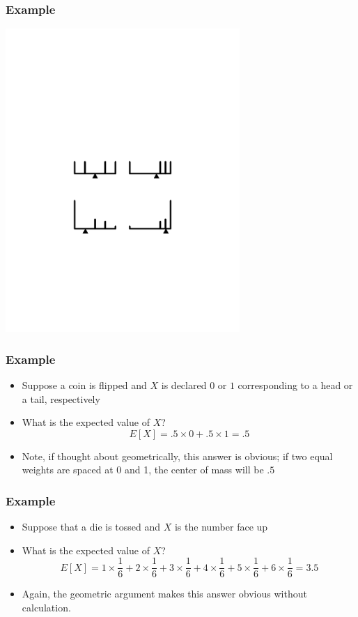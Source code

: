 \documentclass[aspectratio=169]{beamer}
\begin{document}
\begin{frame}
  \frametitle{Example}
  \includegraphics[width=3.5in]{expectation.pdf}
\end{frame}



\begin{frame}
  \frametitle{Example} 
  \begin{itemize}
  \item Suppose a coin is flipped and $X$ is declared $0$ or $1$ corresponding
    to a head or a tail, respectively
  \item What is the expected value of $X$? 
    $$
    E[X] = .5 \times 0 + .5 \times 1 = .5
    $$
  \item Note, if thought about geometrically, this answer is obvious; if two equal
    weights are spaced at 0 and 1, the center of mass will be $.5$
  \end{itemize}
\end{frame}

\begin{frame}\frametitle{Example} 
  \begin{itemize}
  \item Suppose that a die is tossed and $X$ is the number face up
  \item What is the expected value of $X$?
    $$
    E[X] = 1 \times \frac{1}{6} + 2 \times \frac{1}{6} +
    3 \times \frac{1}{6} + 4 \times \frac{1}{6} +
    5 \times \frac{1}{6} + 6 \times \frac{1}{6} = 3.5
    $$
  \item Again, the geometric argument makes this answer obvious without calculation.
  \end{itemize}
\end{frame}
\end{document}
